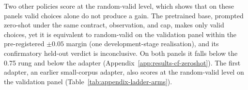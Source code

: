 Two other policies score at the random-valid level, which shows that on these panels valid choices alone do not produce a gain. The pretrained base, prompted zero-shot under the same contract, observation, and cap, makes only valid choices, yet it is equivalent to random-valid on the validation panel within the pre-registered $\pm 0.05$ margin (one development-stage realisation), and its confirmatory held-out verdict is inconclusive. On both panels it falls below the 0.75 rung and below the adapter (Appendix~\ref{app:results-cf-zeroshot}). The first adapter, an earlier small-corpus adapter, also scores at the random-valid level on the validation panel (Table~\ref{tab:appendix-ladder-arms}).

